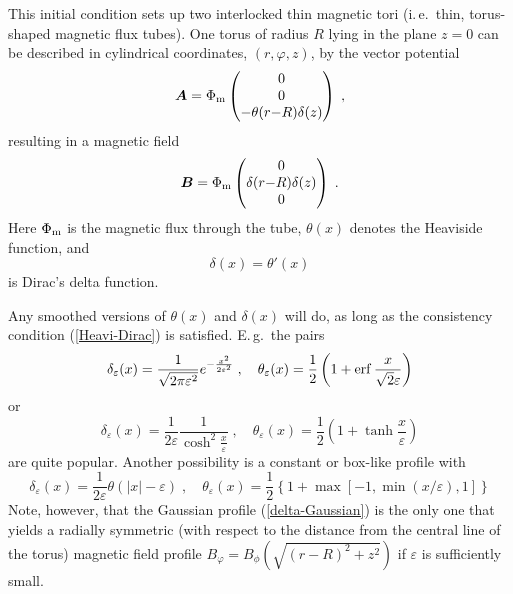\documentclass[\mydriver,12pt,twoside,notitlepage,a4paper]{article}
\renewcommand{\vec}[1]{\mbox{\boldmath{$#1$}}}
\newcommand{\erf}     {\mathop{\rm erf}\nolimits}
\newcommand{\Av}            {\vec{A}}
\newcommand{\Bv}            {\vec{B}}
\newcommand{\Heavi}         {\theta}
\begin{document}
This initial condition sets up two interlocked thin magnetic tori
(i.\,e.~thin, torus-shaped magnetic flux tubes).
One torus of radius $R$ lying in the plane $z=0$ can be described in
cylindrical coordinates, $(r,\varphi,z)$, by the
vector potential
\begin{equation} \label{Av-flux-ring-cyl}
  \Av =
  \Phi_{\rm m}
  \begin{pmatrix}
    0\\ 0\\ -\Heavi(r{-}R) \delta(z)
  \end{pmatrix} \; ,
\end{equation}
resulting in a magnetic field
\begin{equation}
  \Bv =
  \Phi_{\rm m}
  \begin{pmatrix}
    0\\ \delta(r{-}R) \delta(z)\\ 0
  \end{pmatrix} \; .
\end{equation}
Here $\Phi_{\rm m}$ is the magnetic flux through the tube,
$\Heavi(x)$ denotes the Heaviside function, and
\begin{equation} \label{Heavi-Dirac}
 \delta(x) = \Heavi'(x)
\end{equation}
is Dirac's delta function.

Any smoothed versions of $\Heavi(x)$ and $\delta(x)$ will do, as long as
the consistency condition (\ref{Heavi-Dirac}) is satisfied.
E.\,g.~the pairs
\begin{equation} \label{delta-Gaussian}
  \delta_\varepsilon(x)
  = \frac{1}{\sqrt{2\pi\varepsilon^2}} e^{-\frac{x^2}{2\varepsilon^2}} \; ,
  \quad
  \Heavi_\varepsilon(x)
  = \frac{1}{2} \left( 1 + \erf\frac{x}{\sqrt{2}\varepsilon} \right)
\end{equation}
or
\begin{equation}
  \delta_\varepsilon(x)
  = \frac{1}{2\varepsilon}\frac{1}{\cosh^2\frac{x}{\varepsilon}} \; ,
  \quad
  \Heavi_\varepsilon(x)
  = \frac{1}{2} \left( 1 + \tanh\frac{x}{\varepsilon} \right)
\end{equation}
are quite popular.
Another possibility is a constant or box-like profile with
\begin{equation}
  \delta_\varepsilon(x)
  = \frac{1}{2\varepsilon}\Heavi(|x|-\varepsilon) \; ,
  \quad
  \Heavi_\varepsilon(x)
  = \frac{1}{2} \left\{ 1 + \max[-1,\min(x/\varepsilon),1] \right\}
\end{equation}
Note, however, that the Gaussian profile (\ref{delta-Gaussian}) is the
only one that yields a radially symmetric (with respect to the distance
from the central line of the torus) magnetic field profile
$B_\varphi = B_\phi(\sqrt{(r{-}R)^2{+}z^2})$
if $\varepsilon$ is sufficiently small.
\end{document}
